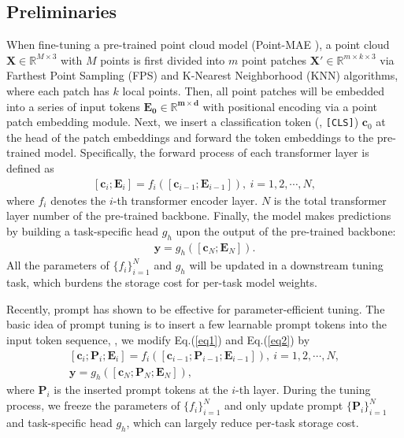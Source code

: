\documentclass[10pt,twocolumn,letterpaper]{article}
\begin{document}
\subsection{Preliminaries}
\label{subsec:prelim}
When fine-tuning a pre-trained point cloud model (\eg Point-MAE \cite{pang2022masked}), a point cloud $\bm X\in \mathbb{R}^{M\times 3}$ with $M$ points is first divided into $m$ point patches $\bm X'\in \mathbb{R}^{m \times k \times 3}$ via Farthest Point Sampling (FPS) and K-Nearest Neighborhood (KNN) algorithms, where each patch has $k$ local points. Then, all point patches will be embedded into a series of input tokens $\bm{E_0\in \mathbb{R}^{m\times d}}$ with positional encoding via a point patch embedding module. Next, we insert a classification token (\ie, \texttt{[CLS]}) $\bm c_{0}$ at the head of the patch embeddings and forward the token embeddings to the pre-trained model. Specifically, the forward process of each transformer layer is defined as
\begin{gather}
    \label{eq1}
    [\bm c_i; \bm E_i] = f_i([\bm c_{i-1}; \bm E_{i-1}]),\ i=1,2,\cdots,N,
\end{gather}
where $f_i$ denotes the $i$-th transformer encoder layer. $N$ is the total transformer layer number of the pre-trained backbone.
Finally, the model makes predictions by building a task-specific head $g_h$ upon the output of the pre-trained backbone: 
\begin{gather}
    \label{eq2}
    \bm y = g_h([\bm c_N; \bm E_N]).
\end{gather}
All the parameters of $\{f_i\}_{i=1}^N$ and $g_h$ will be updated in a downstream tuning task, which burdens the storage cost for per-task model weights.

Recently, prompt \cite{zhou2022learning, jia2022visual} has shown to be effective for parameter-efficient tuning. 
The basic idea of prompt tuning is to insert a few learnable prompt tokens into the input token sequence, \ie, we modify Eq.(\ref{eq1}) and Eq.(\ref{eq2}) by
\begin{gather}
    \label{eq3}
    [\bm c_i; \bm P_i; \bm E_i] = f_i([\bm c_{i-1}; \bm P_{i-1}; \bm E_{i-1}]),\ i=1,2,\cdots,N, \\
    \label{eq4}
    \bm y = g_h([\bm c_N; \bm P_N; \bm E_N]), 
\end{gather}
where $\bm P_i$ is the inserted prompt tokens at the $i$-th layer. 
During the tuning process, we freeze the parameters of $\{f_i\}_{i=1}^N$ and only update prompt $\{\bm P_i\}_{i=1}^N$ and task-specific head $g_h$, which can largely reduce per-task storage cost. 
\end{document}
